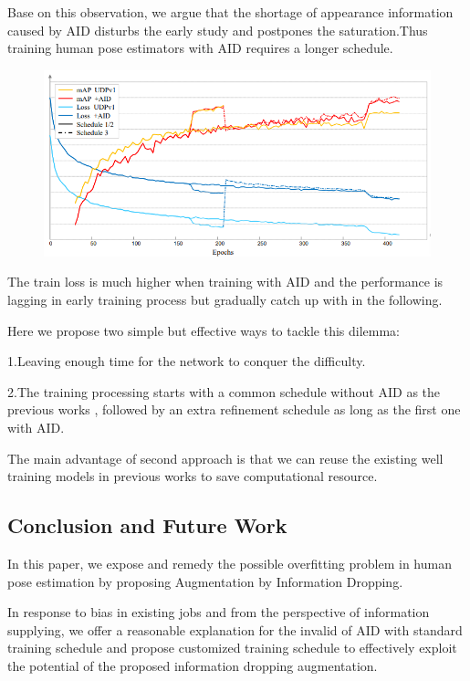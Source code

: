 \documentclass[11pt]{article}
\begin{document}
Base on this observation, we argue that the shortage of appearance information caused by
AID disturbs the early study and postpones the saturation.Thus training human pose estimators with AID requires a longer schedule.
\begin{figure}[H]
	\centering
	\includegraphics[scale = 0.5]{70}
\end{figure}

The train loss is much higher when training with AID and the performance is lagging in early training process but gradually catch up with in the following.

Here we propose two simple but effective ways to tackle this dilemma:

\noindent1.Leaving enough time for the network to conquer the difficulty.

\noindent2.The training processing starts with a common schedule without AID as the previous works , followed by an extra refinement schedule as long as the first one with AID.

The main advantage of second approach is that we can reuse the existing well training models in previous works to save computational resource.

\subsection{Conclusion and Future Work}
In this paper, we expose and remedy the possible overfitting problem in human pose estimation by proposing Augmentation by Information Dropping. 

In response to bias in existing jobs and from the perspective of information supplying, we offer a reasonable explanation for the invalid of AID with standard training schedule and propose customized training schedule to effectively exploit the potential of the proposed information dropping augmentation.
\end{document}
